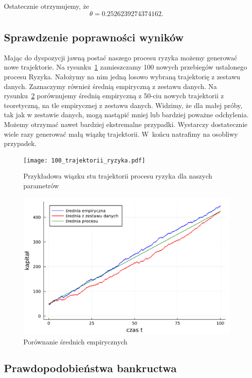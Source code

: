 \documentclass{article}
\theoremstyle{break}
\numberwithin{equation}{subsection}
\numberwithin{figure}{section}
\begin{document}
Ostatecznie otrzymujemy, że $$\theta = 0.2526239274374162. $$


\subsection{Sprawdzenie poprawności wyników}

Mając do dyspozycji jawną postać naszego procesu ryzyka możemy generować nowe trajektorie. Na rysunku~\ref{fig: 7} zamieszczamy 100 nowych przebiegów ustalonego procesu Ryzyka. Nałożymy na nim jedną losowo wybraną trajektorię z zestawu danych. Zaznaczymy również średnią empiryczną z zestawu danych.
Na rysunku~\ref{fig: 8} porównujemy średnią empiryczną z 50-ciu nowych trajektorii z teoretyczną, na tle empirycznej z zestawu danych. Widzimy, że dla małej próby, tak jak w zestawie danych, mogą nastąpić mniej lub bardziej poważne odchylenia. Możemy otrzymać nawet bardziej ekstremalne przypadki. Wystarczy dostatecznie wiele razy generować małą wiązkę trajektorii. W~końcu natrafimy na osobliwy przypadek.

\begin{figure}[H]
	\center
	\texttt{[image: 100\_trajektorii\_ryzyka.pdf]}
	\caption{Przykładowa wiązku stu trajektorii procesu ryzyka dla naszych parametrów}
	\label{fig: 7}
\end{figure}

\begin{figure}[H]
	\center
	\includegraphics[scale=0.35]{porównanie_średnich_procesu_ryzyka.pdf}
	\caption{Porównanie średnich empirycznych}
	\label{fig: 8}
\end{figure}

\subsection{Prawdopodobieństwa bankructwa}
\end{document}
